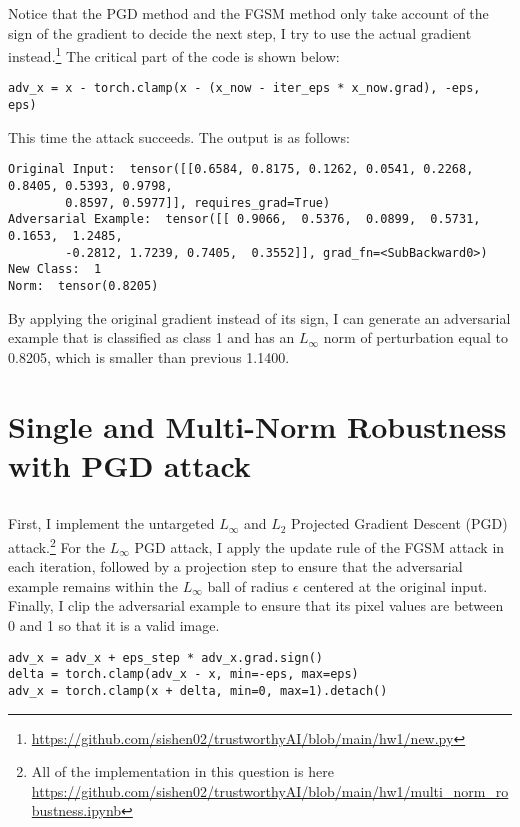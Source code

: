 \documentclass[10pt]{article}
\begin{document}
Notice that the PGD method and the FGSM method only take account of the sign of the gradient to decide the next step, I try to use the actual gradient instead.\footnote{\url{https://github.com/sishen02/trustworthyAI/blob/main/hw1/new.py}} The critical part of the code is shown below:

\begin{Verbatim}[frame=single]
adv_x = x - torch.clamp(x - (x_now - iter_eps * x_now.grad), -eps, eps)
\end{Verbatim}

This time the attack succeeds. The output is as follows:

\begin{Verbatim}[frame=single]
Original Input:  tensor([[0.6584, 0.8175, 0.1262, 0.0541, 0.2268, 0.8405, 0.5393, 0.9798, 
        0.8597, 0.5977]], requires_grad=True)
Adversarial Example:  tensor([[ 0.9066,  0.5376,  0.0899,  0.5731,  0.1653,  1.2485, 
        -0.2812, 1.7239, 0.7405,  0.3552]], grad_fn=<SubBackward0>)
New Class:  1
Norm:  tensor(0.8205)
\end{Verbatim}

By applying the original gradient instead of its sign, I can generate an adversarial example that is classified as class 1 and has an $L_\infty$ norm of perturbation equal to 0.8205, which is smaller than previous 1.1400.

\newpage
\section{Single and Multi-Norm Robustness with PGD attack}

\subsection{}

First, I implement the untargeted $L_\infty$ and $L_2$ Projected Gradient Descent (PGD) attack.\footnote{All of the implementation in this question is here \url{https://github.com/sishen02/trustworthyAI/blob/main/hw1/multi_norm_robustness.ipynb}} For the $L_\infty$ PGD attack, I apply the update rule of the FGSM attack in each iteration, followed by a projection step to ensure that the adversarial example remains within the $L_\infty$ ball of radius $\epsilon$ centered at the original input. Finally, I clip the adversarial example to ensure that its pixel values are between 0 and 1 so that it is a valid image. 

\begin{Verbatim}[frame=single]
adv_x = adv_x + eps_step * adv_x.grad.sign()
delta = torch.clamp(adv_x - x, min=-eps, max=eps)
adv_x = torch.clamp(x + delta, min=0, max=1).detach()  
\end{Verbatim}
\end{document}
